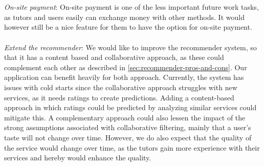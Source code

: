 \\\\
\textit{On-site payment}:
On-site payment is one of the less important future work tasks, as tutors and users easily can exchange money with other methods.
It would however still be a nice feature for them to have the option for on-site payment.
\\\\
\textit{Extend the recommender}:
We would like to improve the recommender system, so that it has a content based and collaborative approach, as these could complement each other as described in \autoref{sec:recommender-pros-and-cons}.
Our application can benefit heavily for both approach.
Currently, the system has issues with cold starts since the collaborative approach struggles with new services, as it needs ratings to create predictions.
Adding a content-based approach in which ratings could be predicted by analyzing similar services could mitigate this.
A complementary approach could also lessen the impact of the strong assumptions associated with collaborative filtering, mainly that a user's taste will not change over time.
However, we do also expect that the quality of the service would change over time, as the tutors gain more experience with their services and hereby would enhance the quality.
